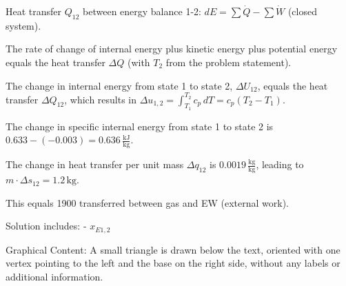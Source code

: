 Heat transfer \( Q_{12} \) between energy balance 1-2: \( dE = \sum \dot{Q} - \sum \dot{W} \) (closed system).

The rate of change of internal energy plus kinetic energy plus potential energy equals the heat transfer \( \Delta Q \) (with \( T_2 \) from the problem statement).

The change in internal energy from state 1 to state 2, \( \Delta U_{12} \), equals the heat transfer \( \Delta Q_{12} \), which results in \( \Delta u_{1,2} = \int_{T_1}^{T_2} c_{p} \, dT = c_{p} (T_2 - T_1) \).

The change in specific internal energy from state 1 to state 2 is \( 0.633 - (-0.003) = 0.636 \, \frac{\text{kJ}}{\text{kg}} \).

The change in heat transfer per unit mass \( \Delta q_{12} \) is \( 0.0019 \, \frac{\text{kg}}{\text{kg}} \), leading to \( m \cdot \Delta s_{12} = 1.2 \, \text{kg} \).

This equals 1900 transferred between gas and EW (external work).

Solution includes:
- \( x_{E1,2} \)

Graphical Content:
A small triangle is drawn below the text, oriented with one vertex pointing to the left and the base on the right side, without any labels or additional information.